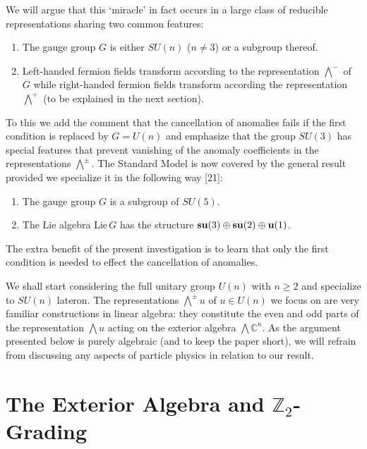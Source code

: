 \documentclass[11pt,a4paper]{article}
\newcommand{\CC}{\mathbb{C}}
\newcommand{\ZZ}{\mathbb{Z}}
\newcommand{\bw}{{\textstyle\bigwedge}}
\begin{document}
We will argue that this `miracle' in fact occurs in a large class
of reducible representations sharing two common features:
\begin{enumerate}
\item The gauge group $G$ is either $SU(n)$ ($n\ne3$) or a subgroup thereof.
\item Left-handed fermion fields transform according to the representation 
      $\bw^-$ of $G$ while right-handed fermion fields transform according 
      the representation $\bw^+$ (to be explained in the next section).
\end{enumerate}
To this we add the comment that the cancellation of anomalies fails if the
first condition is replaced by $G=U(n)$ and emphasize that the group $SU(3)$ 
has special features that prevent vanishing of the
anomaly coefficients in the representations $\bw^\pm$.
The Standard Model is now covered by the general result provided we
specialize it in the following way [21]:
\begin{enumerate}
\item The gauge group $G$ is a subgroup of $SU(5)$.
\item The Lie algebra Lie$\,G$ has the structure ${\bf su}(3)
\oplus{\bf su}(2)\oplus{\bf u}(1)$.
\end{enumerate}
The extra benefit of the present investigation is to learn that only the first 
condition is needed to effect the cancellation of anomalies.

We shall start considering the full unitary group $U(n)$ with $n\ge2$ 
and specialize to $SU(n)$ lateron.
The representations $\bw^\pm u$ of $u\in U(n)$ we focus on are very familiar 
constructions in linear algebra: they constitute the even and odd parts
of the representation $\bw u$ acting on the exterior algebra $\bw\CC^n$. 
As the argument presented below is purely algebraic (and to keep the paper 
short), we will refrain from discussing any aspects of particle physics in
relation to our result.

\section{The Exterior Algebra and $\ZZ_2$-Grading}
\end{document}
